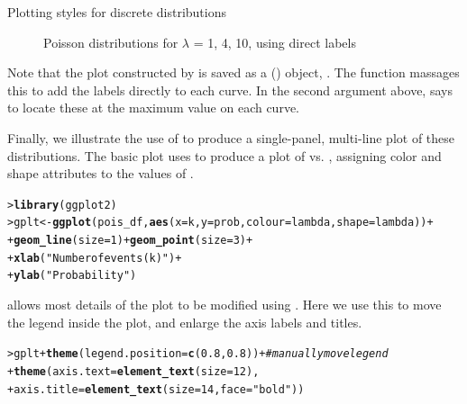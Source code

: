 \documentclass[10pt,krantz2]{krantz}\usepackage[]{graphicx}\usepackage[]{color}
\makeatletter
\newcommand{\hlnum}[1]{\textcolor[rgb]{0.686,0.059,0.569}{#1}}%
\newcommand{\hlstr}[1]{\textcolor[rgb]{0.192,0.494,0.8}{#1}}%
\newcommand{\hlcom}[1]{\textcolor[rgb]{0.678,0.584,0.686}{\textit{#1}}}%
\newcommand{\hlopt}[1]{\textcolor[rgb]{0,0,0}{#1}}%
\newcommand{\hlstd}[1]{\textcolor[rgb]{0.345,0.345,0.345}{#1}}%
\newcommand{\hlkwb}[1]{\textcolor[rgb]{0.69,0.353,0.396}{#1}}%
\newcommand{\hlkwc}[1]{\textcolor[rgb]{0.333,0.667,0.333}{#1}}%
\newcommand{\hlkwd}[1]{\textcolor[rgb]{0.737,0.353,0.396}{\textbf{#1}}}%
\newenvironment{kframe}{%
 \def\at@end@of@kframe{}%
 \ifinner\ifhmode%
  \def\at@end@of@kframe{\end{minipage}}%
  \begin{minipage}{\columnwidth}%
 \fi\fi%
 \def\FrameCommand##1{\hskip\@totalleftmargin \hskip-\fboxsep
 \colorbox{shadecolor}{##1}\hskip-\fboxsep
     \hskip-\linewidth \hskip-\@totalleftmargin \hskip\columnwidth}%
 \MakeFramed {\advance\hsize-\width
   \@totalleftmargin\z@ \linewidth\hsize
   \@setminipage}}%
 {\par\unskip\endMakeFramed%
 \at@end@of@kframe}
\newenvironment{knitrout}{}{} %
\renewenvironment{knitrout}{\small\renewcommand{\baselinestretch}{.85}}{} %
\makeatother
\begin{document}
\begin{Example}{Plotting styles for discrete distributions}
\begin{knitrout}
\begin{figure}[!htbp]
\caption[Poisson distributions for ]{Poisson distributions for $\lambda$ = 1, 4, 10, using direct labels\label{fig:dpois-xyplot2}}
\end{figure}


\end{knitrout}
Note that the plot constructed by  is saved as a
() object, .  The function
massages this to add the labels directly to each curve.  In the
second argument above,  says to locate these
at the maximum value on each curve.

Finally, we illustrate the use of  to produce a single-panel,
multi-line plot of these distributions. The basic plot uses
 to produce a plot of  vs. ,
assigning color and shape attributes to the values of .

\begin{knitrout}
\color{fgcolor}\begin{kframe}
\begin{alltt}
\hlstd{> }\hlkwd{library}\hlstd{(ggplot2)}
\hlstd{> }\hlstd{gplt} \hlkwb{<-} \hlkwd{ggplot}\hlstd{(pois_df,} \hlkwd{aes}\hlstd{(}\hlkwc{x} \hlstd{= k,} \hlkwc{y} \hlstd{= prob,} \hlkwc{colour} \hlstd{= lambda,} \hlkwc{shape} \hlstd{= lambda))} \hlopt{+}
\hlstd{+ }  \hlkwd{geom_line}\hlstd{(}\hlkwc{size} \hlstd{=} \hlnum{1}\hlstd{)} \hlopt{+} \hlkwd{geom_point}\hlstd{(}\hlkwc{size} \hlstd{=} \hlnum{3}\hlstd{)} \hlopt{+}
\hlstd{+ }        \hlkwd{xlab}\hlstd{(}\hlstr{"Number of events (k)"}\hlstd{)} \hlopt{+}
\hlstd{+ }        \hlkwd{ylab}\hlstd{(}\hlstr{"Probability"}\hlstd{)}
\end{alltt}
\end{kframe}
\end{knitrout}
 allows most details of the plot to be modified using
.  Here we use this to move the legend inside the plot,
and enlarge the axis labels and titles.
\begin{knitrout}
\color{fgcolor}\begin{kframe}
\begin{alltt}
\hlstd{> }\hlstd{gplt} \hlopt{+} \hlkwd{theme}\hlstd{(}\hlkwc{legend.position} \hlstd{=} \hlkwd{c}\hlstd{(}\hlnum{0.8}\hlstd{,} \hlnum{0.8}\hlstd{))} \hlopt{+}  \hlcom{# manually move legend}
\hlstd{+ }       \hlkwd{theme}\hlstd{(}\hlkwc{axis.text} \hlstd{=} \hlkwd{element_text}\hlstd{(}\hlkwc{size} \hlstd{=} \hlnum{12}\hlstd{),}
\hlstd{+ }             \hlkwc{axis.title} \hlstd{=} \hlkwd{element_text}\hlstd{(}\hlkwc{size} \hlstd{=} \hlnum{14}\hlstd{,} \hlkwc{face} \hlstd{=} \hlstr{"bold"}\hlstd{))}
\end{alltt}
\end{kframe}\begin{figure}[!htbp]


\end{figure}
\end{knitrout}
\end{Example}
\end{document}
